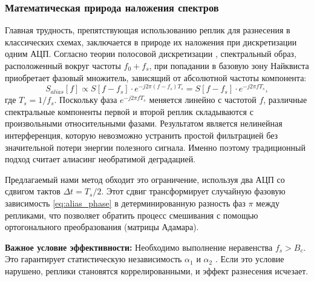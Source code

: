 \documentclass[a4paper,12pt]{article}
\numberwithin{equation}{section}
\begin{document}
\subsubsection*{Математическая природа наложения спектров}
Главная трудность, препятствующая использованию реплик для разнесения в классических схемах, заключается в природе их наложения при дискретизации одним АЦП. Согласно теории полосовой дискретизации \cite{vaughan,harris,vaidyanathan}, спектральный образ, расположенный вокруг частоты $f_0+f_s$, при попадании в базовую зону Найквиста приобретает фазовый множитель, зависящий от абсолютной частоты компонента:
\begin{equation}
S_{alias}[f] \propto S[f - f_s] \cdot e^{-j 2 \pi (f-f_s) T_s} = S[f - f_s] \cdot e^{-j 2 \pi f T_s},
\label{eq:alias_phase}
\end{equation}
где $T_s = 1/f_s$. Поскольку фаза $e^{-j 2 \pi f T_s}$ меняется линейно с частотой $f$, различные спектральные компоненты первой и второй реплик складываются с произвольными относительными фазами. Результатом является нелинейная интерференция, которую невозможно устранить простой фильтрацией без значительной потери энергии полезного сигнала. Именно поэтому традиционный подход считает алиасинг необратимой деградацией.

Предлагаемый нами метод обходит это ограничение, используя два АЦП со сдвигом тактов $\Delta t = T_s/2$. Этот сдвиг трансформирует случайную фазовую зависимость \eqref{eq:alias_phase} в детерминированную разность фаз $\pi$ между репликами, что позволяет обратить процесс смешивания с помощью ортогонального преобразования (матрицы Адамара).

\textbf{Важное условие эффективности:} Необходимо выполнение неравенства $f_s > B_c$. Это гарантирует статистическую независимость $\alpha_1$ и $\alpha_2$ \cite{goldsmith}. Если это условие нарушено, реплики становятся коррелированными, и эффект разнесения исчезает.
\end{document}

